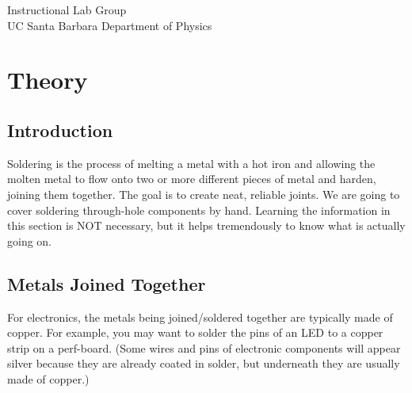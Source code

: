 

\maketitle

\begin{center}
    Instructional Lab Group \\
    UC Santa Barbara Department of Physics
\end{center}

\section{Theory}
\subsection{Introduction}
Soldering is the process of melting a metal with a hot iron and allowing the molten metal to flow onto two or more different pieces of metal and harden, joining them together. The goal is to create neat, reliable joints. We are going to cover soldering through-hole components by hand. Learning the information in this section is NOT necessary, but it helps tremendously to know what is actually going on.

\subsection{Metals Joined Together}
For electronics, the metals being joined/soldered together are typically made of copper. For example, you may want to solder the pins of an LED to a copper strip on a perf-board. (Some wires and pins of electronic components will appear silver because they are already coated in solder, but underneath they are usually made of copper.)

